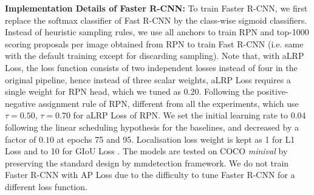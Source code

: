 \documentclass{article}
\begin{document}
\textbf{Implementation Details of Faster R-CNN:} To train Faster R-CNN, we first replace the softmax classifier of  Fast R-CNN by the class-wise sigmoid classifiers. Instead of heuristic sampling rules, we use all anchors to train RPN and top-1000 scoring proposals per image obtained from RPN to train Fast R-CNN (i.e. same with the default training except for discarding sampling). Note that, with aLRP Loss, the loss function consists of two independent losses instead of four in the original pipeline, hence instead of three scalar weights, aLRP Loss requires a single weight for RPN head, which we tuned as $0.20$. Following the positive-negative assignment rule of RPN, different from all the experiments, which use $\tau=0.50$, $\tau=0.70$ for aLRP Loss of RPN. We set the initial learning rate to $0.04$ following the linear scheduling hypothesis \cite{MegDet} for the baselines, and decreased by a factor of $0.10$ at epochs 75 and 95. Localisation loss weight is kept as 1 for L1 Loss and to 10 for GIoU Loss \cite{mmdetection,GIoULoss}. The models are tested on COCO \textit{minival} by preserving the standard design by mmdetection framework. We do not train Faster R-CNN with AP Loss due to the difficulty to tune Faster R-CNN for a different loss function.



 
%
 
\end{document}
